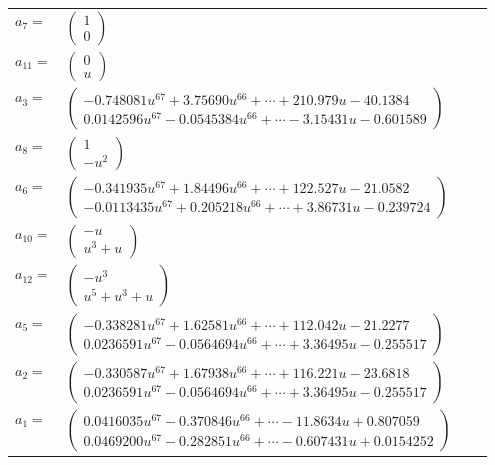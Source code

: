 \documentclass[1p]{elsarticle_modified}
\theoremstyle{definition}
\begin{document}
\begin{tabular}{m{7pt} m{180pt} m{7pt} m{180pt} }
\flushright $a_{7}=$&$\begin{pmatrix}1\\0\end{pmatrix}$ \\
\flushright $a_{11}=$&$\begin{pmatrix}0\\u\end{pmatrix}$ \\
\flushright $a_{3}=$&$\begin{pmatrix}-0.748081 u^{67}+3.75690 u^{66}+\cdots+210.979 u-40.1384\\0.0142596 u^{67}-0.0545384 u^{66}+\cdots-3.15431 u-0.601589\end{pmatrix}$ \\
\flushright $a_{8}=$&$\begin{pmatrix}1\\- u^2\end{pmatrix}$ \\
\flushright $a_{6}=$&$\begin{pmatrix}-0.341935 u^{67}+1.84496 u^{66}+\cdots+122.527 u-21.0582\\-0.0113435 u^{67}+0.205218 u^{66}+\cdots+3.86731 u-0.239724\end{pmatrix}$ \\
\flushright $a_{10}=$&$\begin{pmatrix}- u\\u^3+u\end{pmatrix}$ \\
\flushright $a_{12}=$&$\begin{pmatrix}- u^3\\u^5+u^3+u\end{pmatrix}$ \\
\flushright $a_{5}=$&$\begin{pmatrix}-0.338281 u^{67}+1.62581 u^{66}+\cdots+112.042 u-21.2277\\0.0236591 u^{67}-0.0564694 u^{66}+\cdots+3.36495 u-0.255517\end{pmatrix}$ \\
\flushright $a_{2}=$&$\begin{pmatrix}-0.330587 u^{67}+1.67938 u^{66}+\cdots+116.221 u-23.6818\\0.0236591 u^{67}-0.0564694 u^{66}+\cdots+3.36495 u-0.255517\end{pmatrix}$ \\
\flushright $a_{1}=$&$\begin{pmatrix}0.0416035 u^{67}-0.370846 u^{66}+\cdots-11.8634 u+0.807059\\0.0469200 u^{67}-0.282851 u^{66}+\cdots-0.607431 u+0.0154252\end{pmatrix}$ \\

\end{tabular}
\end{document}
